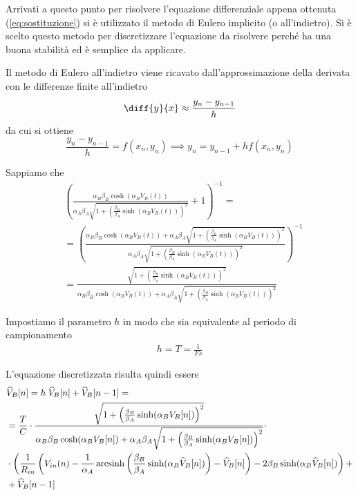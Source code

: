 		Arrivati a questo punto per risolvere l'equazione differenziale appena ottenuta (\ref{eq:sostituzione}) si è utilizzato il metodo di Eulero implicito (o all'indietro). Si è scelto questo metodo per discretizzare l'equazione da risolvere perché ha una buona stabilità ed è semplice da applicare.
		
		Il metodo di Eulero all'indietro viene ricavato dall'approssimazione della derivata con le differenze finite all'indietro
		\[
			\diff{y}{x} \approx \frac{y_{n}-y_{n-1}}{h}
		\]
		da cui si ottiene
		\[
			\frac{y_{n}-y_{n-1}}{h} = f(x_{n},y_{n}) \implies y_{n} = y_{n-1}+hf(x_{n},y_{n})
		\]
		
		Sappiamo che 
		\begin{equation}
			\label{eq:sostituzione}
			\begin{split}
				&\left(\frac{\alpha_{B}\beta_{B}\cosh(\alpha_{B}V_{B}(t))}{\alpha_{A}\beta_{A}\sqrt{1+\left(\frac{\beta_{B}}{\beta_{A}}\sinh(\alpha_{B}V_{B}(t))\right)^{2}}}+1\right)^{-1} =\\
				&= \left(\frac{\alpha_{B}\beta_{B}\cosh(\alpha_{B}V_{B}(t))+\alpha_{A}\beta_{A}\sqrt{1+\left(\frac{\beta_{B}}{\beta_{A}}\sinh(\alpha_{B}V_{B}(t))\right)^{2}}}{\alpha_{A}\beta_{A}\sqrt{1+\left(\frac{\beta_{B}}{\beta_{A}}\sinh(\alpha_{B}V_{B}(t))\right)^{2}}}\right)^{-1}\\
				&= \frac{\sqrt{1+\left(\frac{\beta_{B}}{\beta_{A}}\sinh(\alpha_{B}V_{B}(t))\right)^{2}}}{\alpha_{B}\beta_{B}\cosh(\alpha_{B}V_{B}(t))+\alpha_{A}\beta_{A}\sqrt{1+\left(\frac{\beta_{B}}{\beta_{A}}\sinh(\alpha_{B}V_{B}(t))\right)^{2}}}
			\end{split}
		\end{equation}
		
		Impostiamo il parametro $h$ in modo che sia equivalente al periodo di campionamento
		\begin{equation}
			\label{eq:valore_h}
			\begin{split}
				h = T = \frac{1}{Fs}
			\end{split}
		\end{equation}
		
		L'equazione discretizzata risulta quindi essere
		\begin{equation}
			\label{eq:discretizzazione}
			\begin{split}
				&\widehat V_{B}[n] = h \; \widehat V_{B}[n]+\widehat V_{B}[n-1] =\\
				&= \frac{T}{C}\cdot\frac{\sqrt{1+\left(\frac{\beta_{B}}{\beta_{A}}\sinh(\alpha_{B}V_{B}[n])\right)^{2}}}{\alpha_{B}\beta_{B}\cosh(\alpha_{B}V_{B}[n])+\alpha_{A}\beta_{A}\sqrt{1+\left(\frac{\beta_{B}}{\beta_{A}}\sinh(\alpha_{B}V_{B}[n])\right)^{2}}}\cdot\\&\cdot\left(\frac{1}{R_{in}}\left(V_{in}(n)-\frac{1}{\alpha_{A}} \operatorname{arcsinh} \left(\frac{\beta_{B}}{\beta_{A}} \sinh(\alpha_{B}\widehat V_{B}[n])\right)-\widehat V_{B}[n]\right)-2\beta_{B}\sinh(\alpha_{B}\widehat V_{B}[n])\right)+\\&+\widehat V_{B}[n-1]\\
			\end{split}
		\end{equation}
		\pagebreak
	

